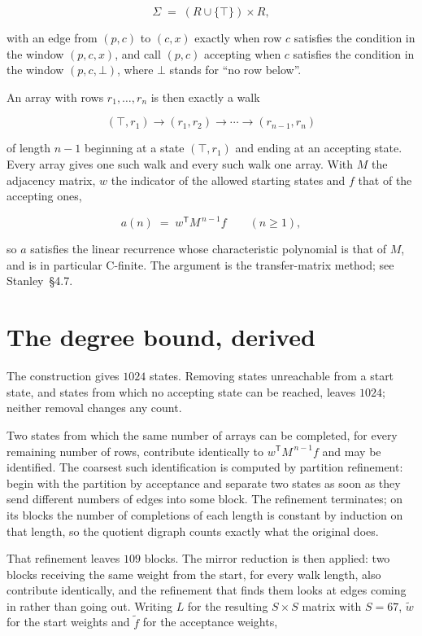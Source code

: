 \documentclass[11pt]{article}
\theoremstyle{definition}
\begin{document}
\[\Sigma \;=\; (R \cup \{\top\}) \times R,\]

with an edge from $(p,c)$ to $(c,x)$ exactly when row $c$ satisfies the condition in the window $(p,c,x)$, and call $(p,c)$ accepting when $c$ satisfies the condition in the window $(p,c,\bot)$, where $\bot$ stands for ``no row below''.

An array with rows $r_1,\dots,r_n$ is then exactly a walk

\[(\top,r_1) \to (r_1,r_2) \to \cdots \to (r_{n-1},r_n)\]

of length $n-1$ beginning at a state $(\top,r_1)$ and ending at an accepting state. Every array gives one such walk and every such walk one array. With $M$ the adjacency matrix, $w$ the indicator of the allowed starting states and $f$ that of the accepting ones,

\[a(n) \;=\; w^{\mathsf T} M^{\,n-1} f \qquad (n \ge 1),\]

so $a$ satisfies the linear recurrence whose characteristic polynomial is that of $M$, and is in particular C-finite. The argument is the transfer-matrix method; see Stanley~\S4.7.

\section{The degree bound, derived}

The construction gives $1024$ states. Removing states unreachable from a start state, and states from which no accepting state can be reached, leaves $1024$; neither removal changes any count.

Two states from which the same number of arrays can be completed, for every remaining number of rows, contribute identically to $w^{\mathsf T}M^{\,n-1}f$ and may be identified. The coarsest such identification is computed by partition refinement: begin with the partition by acceptance and separate two states as soon as they send different numbers of edges into some block. The refinement terminates; on its blocks the number of completions of each length is constant by induction on that length, so the quotient digraph counts exactly what the original does.

That refinement leaves $109$ blocks. The mirror reduction is then applied: two blocks receiving the same weight from the start, for every walk length, also contribute identically, and the refinement that finds them looks at edges coming in rather than going out. Writing $L$ for the resulting $S \times S$ matrix with $S = 67$, $\tilde w$ for the start weights and $\tilde f$ for the acceptance weights,
\end{document}
